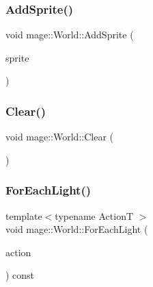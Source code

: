 \hypertarget{classmage_1_1_world_aee109cf9fab0a688507b4faca7a69beb}{}\label{classmage_1_1_world_aee109cf9fab0a688507b4faca7a69beb} 
\subsubsection{\texorpdfstring{Add\+Sprite()}{AddSprite()}}
{\footnotesize\ttfamily void mage\+::\+World\+::\+Add\+Sprite (\begin{DoxyParamCaption}\item[{\hyperlink{namespacemage_a1e01ae66713838a7a67d30e44c67703e}{Shared\+Ptr}$<$ \hyperlink{classmage_1_1_sprite_object}{Sprite\+Object} $>$}]{sprite }\end{DoxyParamCaption})}

\hypertarget{classmage_1_1_world_a5562299c0c78c7f6cb63b2de77c1fe79}{}\label{classmage_1_1_world_a5562299c0c78c7f6cb63b2de77c1fe79} 
\subsubsection{\texorpdfstring{Clear()}{Clear()}}
{\footnotesize\ttfamily void mage\+::\+World\+::\+Clear (\begin{DoxyParamCaption}{ }\end{DoxyParamCaption})}

\hypertarget{classmage_1_1_world_a7f6e04d24be88ae3126021d1b935ef72}{}\label{classmage_1_1_world_a7f6e04d24be88ae3126021d1b935ef72} 
\subsubsection{\texorpdfstring{For\+Each\+Light()}{ForEachLight()}}
{\footnotesize\ttfamily template$<$typename ActionT $>$ \\
void mage\+::\+World\+::\+For\+Each\+Light (\begin{DoxyParamCaption}\item[{ActionT}]{action }\end{DoxyParamCaption}) const}

\hypertarget{classmage_1_1_world_a8f9c130a358f6ce687d2948f477d4ef2}{}\label{classmage_1_1_world_a8f9c130a358f6ce687d2948f477d4ef2} 

